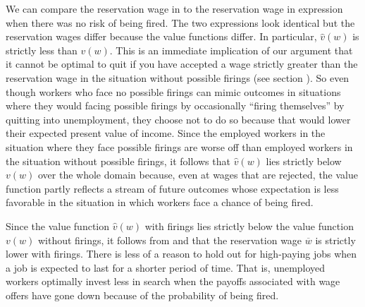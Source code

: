 We can compare the reservation wage in  to the
reservation wage in expression  when there was no risk of
being fired. The two expressions look identical but the reservation
wages differ because the value functions differ.
In particular,  $\hat v(w)$ is  strictly
less than $v(w)$. This is an immediate implication of our argument that it
cannot be optimal to quit if you have accepted a wage strictly
greater than the reservation wage in the situation without possible  firings
(see section ). So even though workers who face no possible firings can mimic outcomes
in situations where they would facing possible firings  by
occasionally ``firing themselves'' by  quitting into unemployment, they choose
not to do so because that would lower their expected present value of income. Since the
employed workers in the situation where they face possible firings are worse off than
employed workers in the situation without possible firings, it follows that $\hat v(w)$
lies strictly below $v(w)$ over the whole domain because, even at wages
that are rejected, the value function partly reflects a stream of future outcomes whose
expectation is less favorable in the situation in which  workers face a chance of
being fired.

Since the value function $\hat v(w)$  with firings lies
strictly below the value function $v(w)$ without firings,
it follows from  and  that the reservation
wage $\overline w$ is strictly lower  with firings.
There is less of a reason to hold out for high-paying jobs when a job
is expected to last for a shorter period of time.
That is, unemployed workers optimally invest less in search when the
payoffs associated with wage offers
have gone down because of the probability of being fired.





